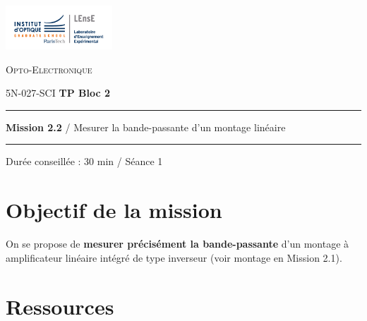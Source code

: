 \newpage
\pagestyle{empty}

\begin{minipage}[c]{.25\linewidth}
	\includegraphics[width=4cm]{images/Logo-LEnsE.png}
\end{minipage} \hfill
\begin{minipage}[c]{.4\linewidth}

\begin{center}
\vspace{0.3cm}
{\Large \textsc{Opto-Electronique}}

\medskip

5N-027-SCI \qquad \textbf{\Large TP Bloc 2}

\end{center}
\end{minipage}\hfill

\vspace{0.5cm}

\noindent \rule{\linewidth}{1pt}

{\noindent\Large \rule[-7pt]{0pt}{30pt} \textbf{Mission 2.2} / Mesurer la bande-passante d'un montage linéaire} 

\noindent \rule{\linewidth}{1pt}

\vspace{-0.3cm}

\begin{center}

Durée conseillée : 30 min / Séance 1

\end{center}

\section{Objectif de la mission}
\label{mission22}

On se propose de \textbf{mesurer précisément la bande-passante} d'un montage à amplificateur linéaire intégré de type inverseur (voir montage en Mission 2.1).


\section{Ressources}

